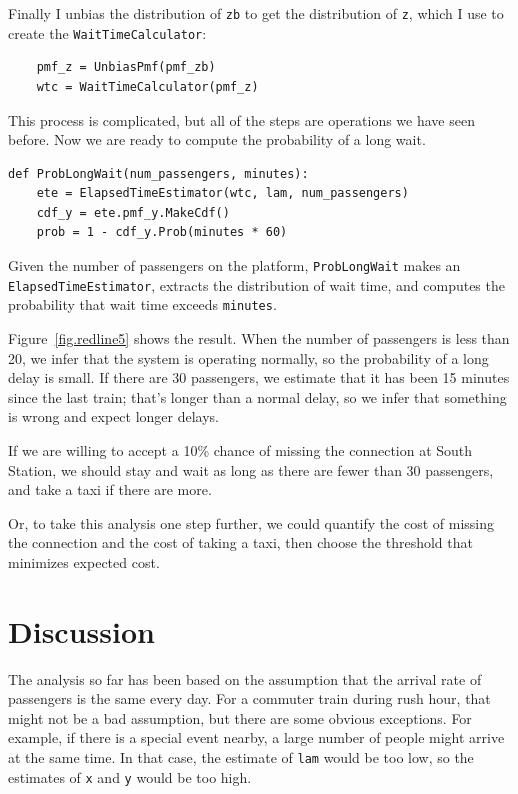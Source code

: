 \documentclass[12pt]{book}
\begin{document}
Finally I unbias the distribution of {\tt zb} to get the
distribution of {\tt z}, which I use to create the
{\tt WaitTimeCalculator}:

\begin{verbatim}
    pmf_z = UnbiasPmf(pmf_zb)
    wtc = WaitTimeCalculator(pmf_z)
\end{verbatim}

This process is complicated, but
all of the steps are operations we have seen before.
Now we are ready to compute the probability of a long wait.

\begin{verbatim}
def ProbLongWait(num_passengers, minutes):
    ete = ElapsedTimeEstimator(wtc, lam, num_passengers)
    cdf_y = ete.pmf_y.MakeCdf()
    prob = 1 - cdf_y.Prob(minutes * 60)
\end{verbatim}

Given the number of passengers on the platform,
{\tt ProbLongWait} 
makes an {\tt ElapsedTimeEstimator},
extracts the distribution of wait time, and 
computes 
the probability that wait time
exceeds {\tt minutes}.

Figure~\ref{fig.redline5} shows the result.  When the number of
passengers is less than 20, we infer that the system is
operating normally, so the probability of a long delay is small.
If there are 30 passengers, we estimate that it has been 15
minutes since the last train; that's longer than a normal delay,
so we infer that something is wrong and expect longer delays.

If we are willing to accept a 10\% chance of missing the connection
at South Station, we should stay and wait as long as there
are fewer than 30 passengers, and take a taxi if there are more.

Or, to take this analysis one step further, we could quantify the cost
of missing the connection and the cost of taking a taxi, then choose
the threshold that minimizes expected cost.

\section{Discussion}

The analysis so far has been based on the assumption that the
arrival rate of passengers is the same every day.  For a commuter
train during rush hour, that might not be a bad assumption, but
there are some obvious exceptions.  For example, if there is a special
event nearby, a large number of people might arrive at the same time.
In that case, the estimate of {\tt lam} would be too low, so the
estimates of {\tt x} and {\tt y} would be too high.
\end{document}
